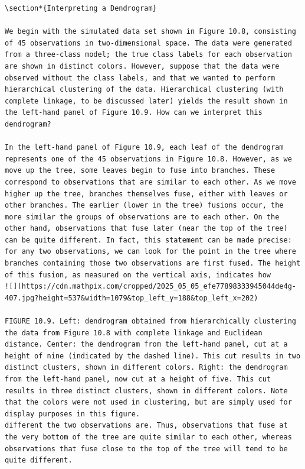 \documentclass[10pt]{article}
\begin{document}
\begin{verbatim}
\section*{Interpreting a Dendrogram}

We begin with the simulated data set shown in Figure 10.8, consisting of 45 observations in two-dimensional space. The data were generated from a three-class model; the true class labels for each observation are shown in distinct colors. However, suppose that the data were observed without the class labels, and that we wanted to perform hierarchical clustering of the data. Hierarchical clustering (with complete linkage, to be discussed later) yields the result shown in the left-hand panel of Figure 10.9. How can we interpret this dendrogram?

In the left-hand panel of Figure 10.9, each leaf of the dendrogram represents one of the 45 observations in Figure 10.8. However, as we move up the tree, some leaves begin to fuse into branches. These correspond to observations that are similar to each other. As we move higher up the tree, branches themselves fuse, either with leaves or other branches. The earlier (lower in the tree) fusions occur, the more similar the groups of observations are to each other. On the other hand, observations that fuse later (near the top of the tree) can be quite different. In fact, this statement can be made precise: for any two observations, we can look for the point in the tree where branches containing those two observations are first fused. The height of this fusion, as measured on the vertical axis, indicates how
![](https://cdn.mathpix.com/cropped/2025_05_05_efe77898333945044de4g-407.jpg?height=537&width=1079&top_left_y=188&top_left_x=202)

FIGURE 10.9. Left: dendrogram obtained from hierarchically clustering the data from Figure 10.8 with complete linkage and Euclidean distance. Center: the dendrogram from the left-hand panel, cut at a height of nine (indicated by the dashed line). This cut results in two distinct clusters, shown in different colors. Right: the dendrogram from the left-hand panel, now cut at a height of five. This cut results in three distinct clusters, shown in different colors. Note that the colors were not used in clustering, but are simply used for display purposes in this figure.
different the two observations are. Thus, observations that fuse at the very bottom of the tree are quite similar to each other, whereas observations that fuse close to the top of the tree will tend to be quite different.


\end{verbatim}
\end{document}
